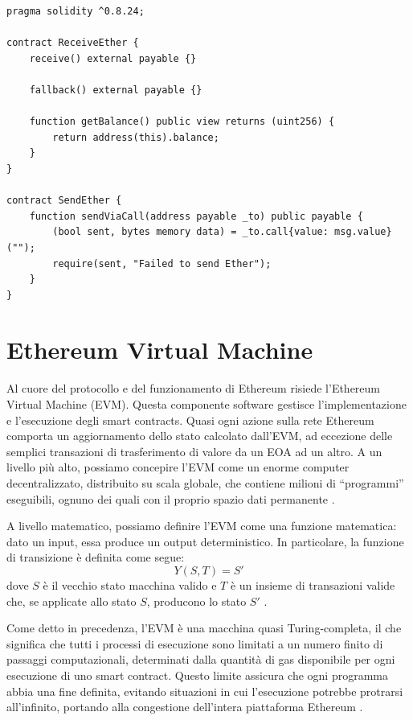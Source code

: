 \begin{algorithm}[ht]
    \caption{Esempio di smart contract in Solidity.}
    \label{lst:esempioSolidity}
    \begin{lstlisting}[style=customsolidity, language=Solidity]
pragma solidity ^0.8.24;

contract ReceiveEther {
    receive() external payable {}

    fallback() external payable {}

    function getBalance() public view returns (uint256) {
        return address(this).balance;
    }
}

contract SendEther {
    function sendViaCall(address payable _to) public payable {
        (bool sent, bytes memory data) = _to.call{value: msg.value}("");
        require(sent, "Failed to send Ether");
    }
}
    \end{lstlisting}
\end{algorithm}


\newpage
\section{Ethereum Virtual Machine}\label{sec:EVM}
Al cuore del protocollo e del funzionamento di Ethereum risiede l’Ethereum Virtual Machine (EVM). Questa componente software gestisce l’implementazione 
e l’esecuzione degli smart contracts. Quasi ogni azione sulla rete Ethereum comporta un aggiornamento dello stato calcolato dall’EVM, ad eccezione 
delle semplici transazioni di trasferimento di valore da un EOA ad un altro. A un livello più alto, possiamo concepire l’EVM come un enorme computer 
decentralizzato, distribuito su scala globale, che contiene milioni di “programmi” eseguibili, ognuno dei quali con il proprio spazio dati permanente 
\cite{antonopoulos2018mastering}.

A livello matematico, possiamo definire l’EVM come una funzione matematica: dato un input, essa produce un output deterministico. In particolare, la 
funzione di transizione è definita come segue: 
$$Y(S,T)=S'$$ 
dove $S$ è il vecchio stato macchina valido e $T$ è un insieme di transazioni valide che, 
se applicate allo stato $S$, producono lo stato $S'$ \cite{ethereumvirtualmachine}.

Come detto in precedenza, l’EVM è una macchina quasi Turing-completa, il che significa che tutti i processi di esecuzione sono limitati a un numero 
finito di passaggi computazionali, determinati dalla quantità di gas disponibile per ogni esecuzione di uno smart contract. Questo limite assicura 
che ogni programma abbia una fine definita, evitando situazioni in cui l’esecuzione potrebbe protrarsi all’infinito, portando alla congestione 
dell’intera piattaforma Ethereum \cite{antonopoulos2018mastering}.

